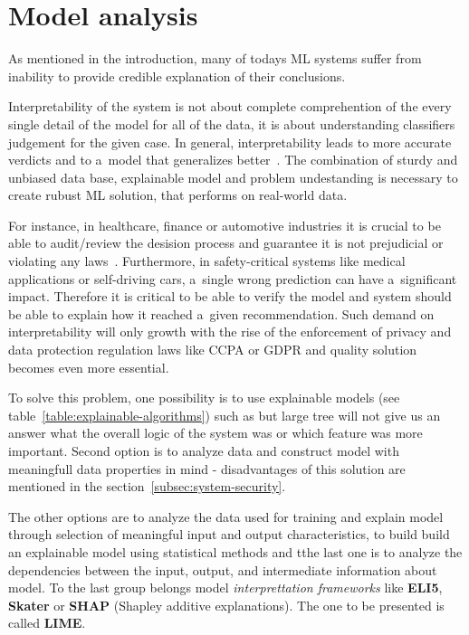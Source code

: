 \chapter{Model analysis}\label{ch:model-analysis}

As mentioned in the introduction, many of todays ML systems suffer from inability to provide credible explanation of their conclusions.

Interpretability of the system is not about complete comprehention of the every single detail of the model for all of the data, it is about understanding classifiers judgement for the given case.
In general, interpretability leads to more accurate verdicts and to a~model that generalizes better~\cite{article:interpretability-in-machine-learning}.
The combination of sturdy and unbiased data base, explainable model and problem undestanding is necessary to create rubust ML solution, that performs on real-world data.

For instance, in healthcare, finance or automotive industries it is crucial to be able to audit/review the desision process and guarantee it is not prejudicial or violating any laws~\cite{article:interpretability-in-machine-learning}.
Furthermore, in safety-critical systems like medical applications or self-driving cars, a~single wrong prediction can have a~significant impact.
Therefore it is critical to be able to verify the model and system should be able to explain how it reached a~given recommendation.
Such demand on interpretability will only growth with the rise of the enforcement of privacy and data protection regulation laws like CCPA or GDPR and quality solution becomes even more essential.

To solve this problem, one possibility is to use explainable models (see table~\ref{table:explainable-algorithms}) such as  but large tree will not give us an answer what the overall logic of the system was or which feature was more important.
Second option is to analyze data and construct model with meaningfull data properties in mind - disadvantages of this solution are mentioned in the section~\ref{subsec:system-security}.

The other options are to analyze the data used for training and explain model through selection of meaningful input and output characteristics, to build build an explainable model using statistical methods and tthe last one is to analyze the dependencies between the input, output, and intermediate information about model.
To the last group belongs model \textit{interprettation frameworks} like \textbf{ELI5}, \textbf{Skater} or \textbf{SHAP} (Shapley additive explanations).
The one to be presented is called \textbf{LIME}.


